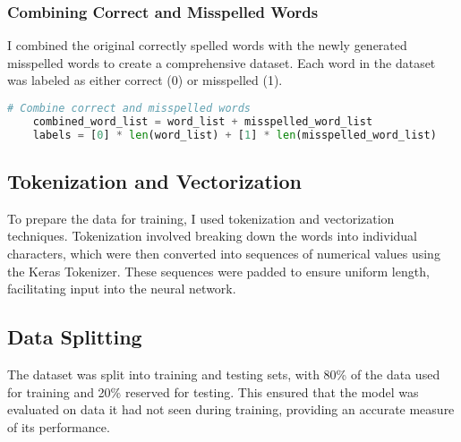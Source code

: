 \subsubsection{Combining Correct and Misspelled Words}
I combined the original correctly spelled words with the newly generated misspelled words to create a comprehensive dataset. Each word in the dataset was labeled as either correct (0) or misspelled (1).
\begin{lstlisting}[language=Python, caption=Data Collection and Preprocessing]
    # Combine correct and misspelled words
    combined_word_list = word_list + misspelled_word_list
    labels = [0] * len(word_list) + [1] * len(misspelled_word_list)    
\end{lstlisting}

\subsection{Tokenization and Vectorization}
To prepare the data for training, I used tokenization and vectorization techniques. Tokenization involved breaking down the words into individual characters, which were then converted into sequences of numerical values using the Keras Tokenizer. These sequences were padded to ensure uniform length, facilitating input into the neural network.

\subsection{Data Splitting}
The dataset was split into training and testing sets, with 80\% of the data used for training and 20\% reserved for testing. This ensured that the model was evaluated on data it had not seen during training, providing an accurate measure of its performance.

